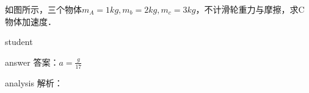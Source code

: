 \begin{example}
	如图所示，三个物体$ m_A = 1\si{kg},m_b = 2\si{kg},m_c = 3\si{kg} $，不计滑轮重力与摩擦，求C物体加速度．
	
	\begin{taggedblock}{student}
		\vspace*{2cm}
	\end{taggedblock}
	
	
	\begin{taggedblock}{answer}
		答案：$ a = \frac{g}{17} $
	\end{taggedblock}
	
	
	\begin{taggedblock}{analysis}
		解析：
	\end{taggedblock}
\end{example}


